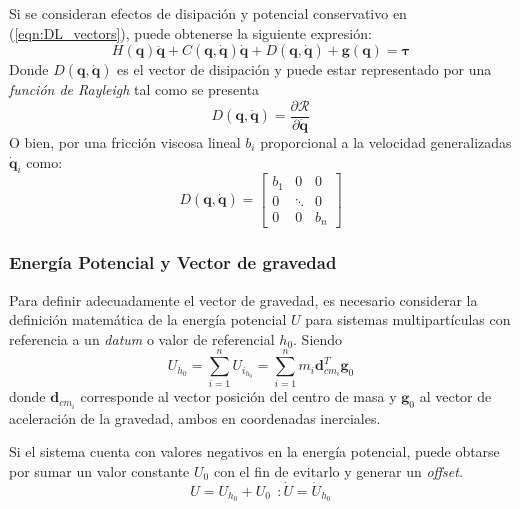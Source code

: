     Si se consideran efectos de disipación y potencial conservativo en (\ref{eqn:DL_vectors}), puede obtenerse la siguiente expresión:
    \begin{equation}
        \label{eqn:DL_final}
        H(\boldsymbol{q}) \boldsymbol{\ddot{q}} + C(\boldsymbol{q}, \boldsymbol{\dot{q}}) \boldsymbol{\dot{q}} + D(\boldsymbol{q}, \boldsymbol{\dot{q}})
        + \boldsymbol{g}(\boldsymbol{q}) = \boldsymbol{\tau}
    \end{equation}
    Donde $D(\boldsymbol{q}, \boldsymbol{\dot{q}})$ es el vector de disipación y puede estar representado por una \emph{función de Rayleigh} tal como se presenta
    \begin{equation}
        \label{eqn:disipacion_ray}
        D(\boldsymbol{q}, \boldsymbol{\dot{q}}) = \frac{\partial \mathcal{R}}{\partial \boldsymbol{\dot{q}}}
    \end{equation} 
    O bien, por una fricción viscosa lineal $b_i$ proporcional a la velocidad generalizadas $\boldsymbol{\dot{q}}_i$ como:
    \begin{equation}
        \label{eqn:disipacion_simple}
        D(\boldsymbol{q}, \boldsymbol{\dot{q}}) = \begin{bmatrix} b_1 & 0 & 0 \\ 0 & \ddots & 0 \\ 0 & 0 & b_n  \end{bmatrix} 
    \end{equation}

    \subsubsection{Energía Potencial y Vector de gravedad}
    Para definir adecuadamente el vector de gravedad, es necesario considerar la definición matemática de la energía potencial $U$ para sistemas multipartículas con
    referencia a un \emph{datum} o valor de referencial $h_0$. Siendo
    \begin{equation}
        \label{eqn:energia_potencial}
         U_{h_0} = \sum_{i=1}^n U_{i_{h_0}} =  \sum_{i=1}^n m_i \boldsymbol{d}_{cm_i}^T \boldsymbol{g}_0
    \end{equation}
    donde $\boldsymbol{d}_{cm_i}$ corresponde al vector posición del centro de masa y $\boldsymbol{g}_0$ al vector de aceleración de la gravedad, ambos
    en coordenadas inerciales. 

    Si el sistema cuenta con valores negativos en la energía potencial, puede obtarse por sumar un valor constante $U_0$ con el fin de evitarlo y generar un \emph{offset}. 
    \begin{equation}
        \label{eqn:energia_potencial_offset}
         U = U_{h_0}+U_0 \: \: : \dot{U} = \dot{U}_{h_0} 
    \end{equation}

